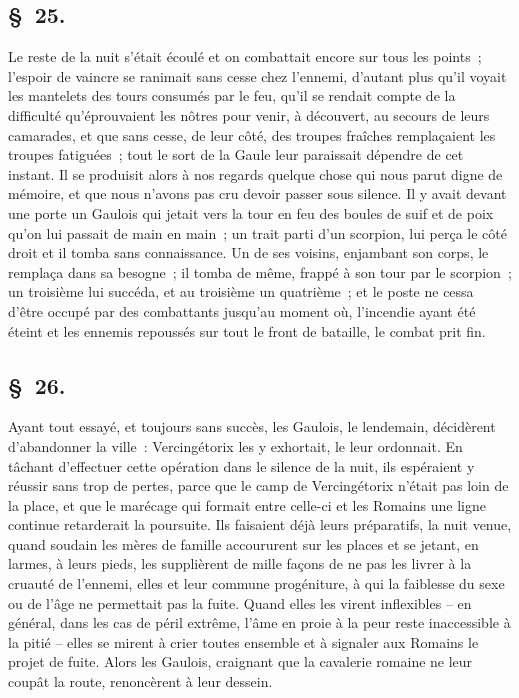 \documentclass[french,twoside]{book} %
\begin{document}
\subsection[{§ 25.}]{ \textsc{§ 25.} }
\noindent Le reste de la nuit s’était écoulé et on combattait encore sur tous les points ; l’espoir de vaincre se ranimait sans cesse chez l’ennemi, d’autant plus qu’il voyait les mantelets des tours consumés par le feu, qu’il se rendait compte de la difficulté qu’éprouvaient les nôtres pour venir, à découvert, au secours de leurs camarades, et que sans cesse, de leur côté, des troupes fraîches remplaçaient les troupes fatiguées ; tout le sort de la Gaule leur paraissait dépendre de cet instant. Il se produisit alors à nos regards quelque chose qui nous parut digne de mémoire, et que nous n’avons pas cru devoir passer sous silence. Il y avait devant une porte un Gaulois qui jetait vers la tour en feu des boules de suif et de poix qu’on lui passait de main en main ; un trait parti d’un scorpion, lui perça le côté droit et il tomba sans connaissance. Un de ses voisins, enjambant son corps, le remplaça dans sa besogne ; il tomba de même, frappé à son tour par le scorpion ; un troisième lui succéda, et au troisième un quatrième ; et le poste ne cessa d’être occupé par des combattants jusqu’au moment où, l’incendie ayant été éteint et les ennemis repoussés sur tout le front de bataille, le combat prit fin.
\subsection[{§ 26.}]{ \textsc{§ 26.} }
\noindent Ayant tout essayé, et toujours sans succès, les Gaulois, le lendemain, décidèrent d’abandonner la ville : Vercingétorix les y exhortait, le leur ordonnait. En tâchant d’effectuer cette opération dans le silence de la nuit, ils espéraient y réussir sans trop de pertes, parce que le camp de Vercingétorix n’était pas loin de la place, et que le marécage qui formait entre celle-ci et les Romains une ligne continue retarderait la poursuite. Ils faisaient déjà leurs préparatifs, la nuit venue, quand soudain les mères de famille accoururent sur les places et se jetant, en larmes, à leurs pieds, les supplièrent de mille façons de ne pas les livrer à la cruauté de l’ennemi, elles et leur commune progéniture, à qui la faiblesse du sexe ou de l’âge ne permettait pas la fuite. Quand elles les virent inflexibles – en général, dans les cas de péril extrême, l’âme en proie à la peur reste inaccessible à la pitié – elles se mirent à crier toutes ensemble et à signaler aux Romains le projet de fuite. Alors les Gaulois, craignant que la cavalerie romaine ne leur coupât la route, renoncèrent à leur dessein.
\end{document}
